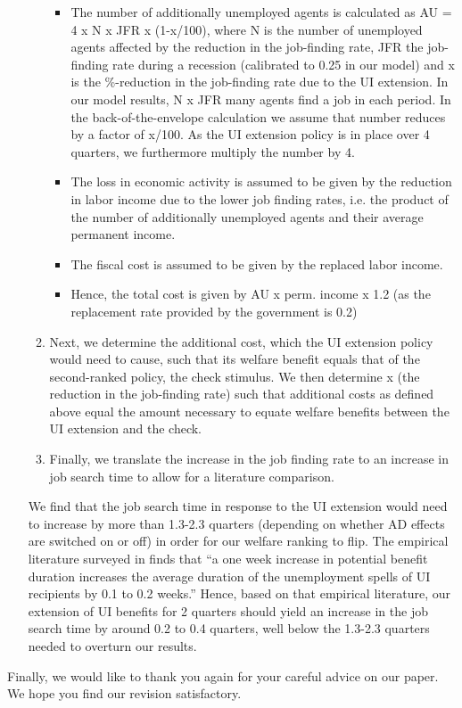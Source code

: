 \documentclass[12pt,letterpaper,english]{article}
\begin{document}
\begin{itemize}
\begin{enumerate}
		\begin{itemize}
			
			\item The number of additionally unemployed agents is calculated as AU = 4 x N x JFR x (1-x/100), where N is the number of unemployed agents affected by the reduction in the job-finding rate, JFR the job-finding rate during a recession (calibrated to 0.25 in our model) and x is the \%-reduction in the job-finding rate due to the UI extension. In our model results, N x JFR many agents find a job in each period. In the back-of-the-envelope calculation we assume that number reduces by a factor of x/100. As the UI extension policy is in place over 4 quarters, we furthermore multiply the number by 4.
			
			\item The loss in economic activity is assumed to be given by the reduction in labor income due to the lower job finding rates, i.e. the product of the number of additionally unemployed agents and their average permanent income.
			
			\item The fiscal cost is assumed to be given by the replaced labor income.
			
			\item Hence, the total cost is given by AU x perm. income x 1.2 (as the replacement rate provided by the government is 0.2)
			
		\end{itemize}
		
		\item Next, we determine the additional cost, which the UI extension policy would need to cause, such that its welfare benefit equals that of the second-ranked policy, the check stimulus. We then determine x (the reduction in the job-finding rate) such that additional costs as defined above equal the amount necessary to equate welfare benefits between the UI extension and the check.
		
		\item Finally, we translate the increase in the job finding rate to an increase in job search time to allow for a literature comparison.
		
	\end{enumerate}
	
	
	We find that the job search time in response to the UI extension would need to increase by more than 1.3-2.3 quarters (depending on whether AD effects are switched on or off) in order for our welfare ranking to flip. The empirical literature surveyed in \citet{hagedorn2019unemployment} finds that “a one week increase in potential benefit duration increases the average duration of the unemployment spells of UI recipients by 0.1 to 0.2 weeks.” Hence, based on that empirical literature, our extension of UI benefits for 2 quarters should yield an increase in the job search time by around 0.2 to 0.4 quarters, well below the 1.3-2.3 quarters needed to overturn our results.
	
\end{itemize}

\bigskip

\noindent Finally, we would like to thank you again for your careful advice on our paper. We hope you find our revision satisfactory.



\end{document}
